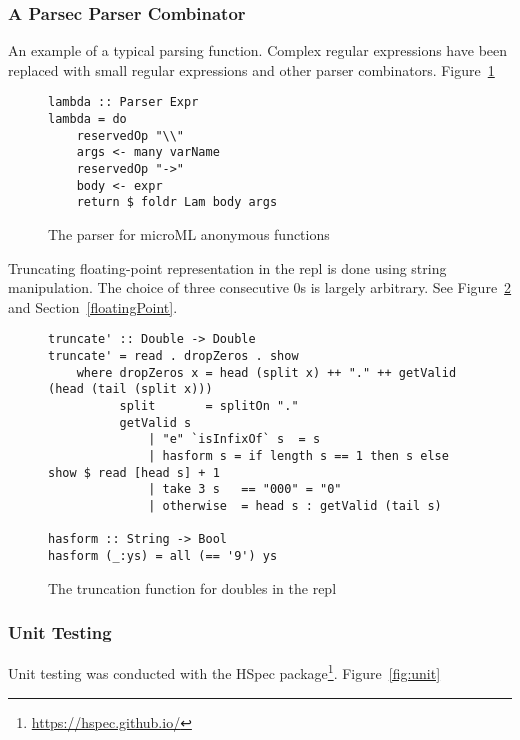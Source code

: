 \subsubsection{A Parsec Parser Combinator}
An example of a typical parsing function. Complex regular expressions have been replaced with small
regular expressions and other parser combinators. Figure~\ref{fig:parsec}

\begin{figure}
    \begin{verbatim}
lambda :: Parser Expr
lambda = do
    reservedOp "\\"
    args <- many varName
    reservedOp "->"
    body <- expr
    return $ foldr Lam body args
    \end{verbatim}
    \caption{The parser for microML anonymous functions}
\label{fig:parsec}
\end{figure}
Truncating floating-point representation in the repl is done using string manipulation. The choice
of three consecutive 0s is largely arbitrary. See Figure~\ref{fig:trunc} and
Section~\ref{floatingPoint}.
\begin{figure}
    \begin{verbatim}
truncate' :: Double -> Double
truncate' = read . dropZeros . show
    where dropZeros x = head (split x) ++ "." ++ getValid (head (tail (split x)))
          split       = splitOn "."
          getValid s 
              | "e" `isInfixOf` s  = s
              | hasform s = if length s == 1 then s else  show $ read [head s] + 1
              | take 3 s   == "000" = "0"
              | otherwise  = head s : getValid (tail s) 

hasform :: String -> Bool
hasform (_:ys) = all (== '9') ys 
    \end{verbatim}
    \caption{The truncation function for doubles in the repl}
\label{fig:trunc}
\end{figure}

\subsubsection{Unit Testing}
Unit testing was conducted with the HSpec package\footnote{\url{https://hspec.github.io/}}.
Figure~\ref{fig:unit}

